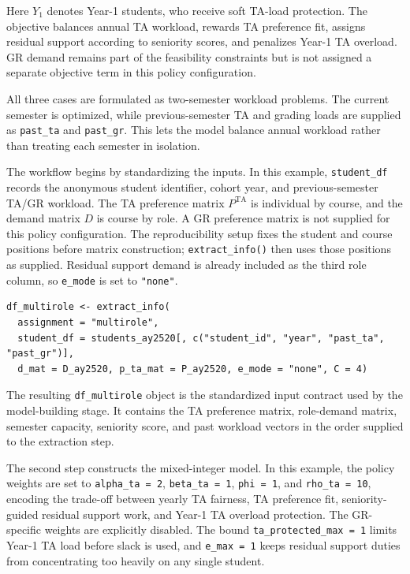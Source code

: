 Here \(Y_1\) denotes Year-1 students, who receive soft TA-load protection.
The objective balances annual TA workload, rewards TA preference fit, assigns
residual support according to seniority scores, and penalizes Year-1 TA overload.
GR demand remains part of the feasibility constraints but is not assigned a
separate objective term in this policy configuration.

All three cases are formulated as two-semester workload problems. The current
semester is optimized, while previous-semester TA and grading loads are supplied
as \texttt{past\_ta} and \texttt{past\_gr}. This lets the model balance annual workload rather
than treating each semester in isolation.

The workflow begins by standardizing the inputs. In this example, \texttt{student\_df}
records the anonymous student identifier, cohort year, and previous-semester
TA/GR workload. The TA preference matrix \(P^{\mathrm{TA}}\) is individual by
course, and the demand matrix \(D\) is course by role. A GR preference matrix is
not supplied for this policy configuration. The reproducibility setup fixes the
student and course positions before matrix construction; \texttt{extract\_info()} then
uses those positions as supplied.
Residual support demand is already included as the third role column, so
\texttt{e\_mode} is set to \texttt{"none"}.

\begin{verbatim}
df_multirole <- extract_info(
  assignment = "multirole",
  student_df = students_ay2520[, c("student_id", "year", "past_ta", "past_gr")],
  d_mat = D_ay2520, p_ta_mat = P_ay2520, e_mode = "none", C = 4)
\end{verbatim}

The resulting \texttt{df\_multirole} object is the standardized input contract used by
the model-building stage. It contains the TA preference matrix, role-demand
matrix, semester capacity, seniority score, and past workload vectors in the
order supplied to the extraction step.

The second step constructs the mixed-integer model. In this example, the policy
weights are set to \texttt{alpha\_ta\ =\ 2}, \texttt{beta\_ta\ =\ 1}, \texttt{phi\ =\ 1}, and
\texttt{rho\_ta\ =\ 10}, encoding the trade-off between yearly TA fairness, TA preference
fit, seniority-guided residual support work, and Year-1 TA overload protection.
The GR-specific weights are explicitly disabled. The bound
\texttt{ta\_protected\_max\ =\ 1} limits Year-1 TA load before slack is
used, and \texttt{e\_max\ =\ 1} keeps residual support duties from concentrating too
heavily on any single student.

